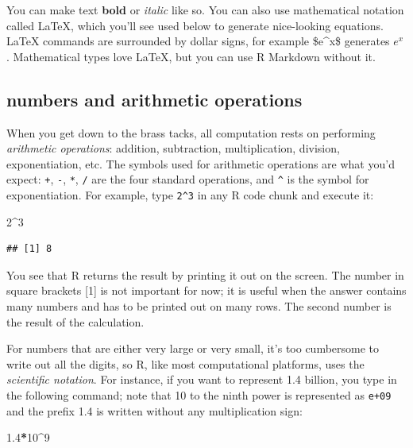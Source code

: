 \documentclass[
]{book}
\newenvironment{Shaded}{\begin{snugshade}}{\end{snugshade}}
\newcommand{\DecValTok}[1]{\textcolor[rgb]{0.00,0.00,0.81}{#1}}
\newcommand{\FloatTok}[1]{\textcolor[rgb]{0.00,0.00,0.81}{#1}}
\newcommand{\OperatorTok}[1]{\textcolor[rgb]{0.81,0.36,0.00}{\textbf{#1}}}
\begin{document}
You can make text \textbf{bold} or \emph{italic} like so. You can also use mathematical notation called LaTeX, which you'll see used below to generate nice-looking equations. LaTeX commands are surrounded by dollar signs, for example \$e\^{}x\$ generates \(e^x\). Mathematical types love LaTeX, but you can use R Markdown without it.

\hypertarget{numbers-and-arithmetic-operations}{%
\subsection{numbers and arithmetic operations}\label{numbers-and-arithmetic-operations}}

When you get down to the brass tacks, all computation rests on performing  \emph{arithmetic operations}: addition, subtraction, multiplication, division, exponentiation, etc. The symbols used for arithmetic operations are what you'd expect: \texttt{+}, \texttt{-}, \texttt{*}, \texttt{/} are the four standard operations, and \texttt{\^{}} is the symbol for exponentiation. For example, type \texttt{2\^{}3} in any R code chunk and execute it:

\begin{Shaded}
\begin{Highlighting}[]
\DecValTok{2}\OperatorTok{\^{}}\DecValTok{3}
\end{Highlighting}
\end{Shaded}

\begin{verbatim}
## [1] 8
\end{verbatim}

You see that R returns the result by printing it out on the screen. The number in square brackets {[}1{]} is not important for now; it is useful when the answer contains many numbers and has to be printed out on many rows. The second number is the result of the calculation.

For numbers that are either very large or very small, it's too cumbersome to write out all the digits, so R, like most computational platforms, uses the \emph{scientific notation}. For instance, if you want to represent 1.4 billion, you type in the following command; note that 10 to the ninth power is represented as \texttt{e+09} and the prefix 1.4 is written without any multiplication sign:

\begin{Shaded}
\begin{Highlighting}[]
\FloatTok{1.4}\OperatorTok{*}\DecValTok{10}\OperatorTok{\^{}}\DecValTok{9}
\end{Highlighting}
\end{Shaded}
\end{document}
